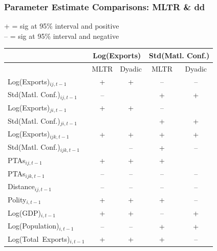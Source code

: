 \documentclass[10pt, compress]{beamer}
\begin{document}
\frame
{
  \frametitle{Parameter Estimate Comparisons: MLTR \& dd}
  \footnotesize{+ = sig at 95\% interval and positive} \\
  \footnotesize{--\; = sig at 95\% interval and negative}
  
  \centering
  \begin{tabular}{l | cc | cc}
~ & \multicolumn{2}{c}{Log(Exports)} & \multicolumn{2}{c}{Std(Matl. Conf.)} \\
\hline\hline
~ & MLTR & Dyadic & MLTR & Dyadic \\
\hline
  Log(Exports)$_{ij, t-1}$ & + & + & -- & -- \\
  Std(Matl. Conf.)$_{ij, t-1}$ & -- &  & + & + \\
  Log(Exports)$_{ji, t-1}$ & + & + & -- &  \\
  Std(Matl. Conf.)$_{ji, t-1}$ &  &  & + & + \\
  Log(Exports)$_{ijk, t-1}$ & + & + & + & + \\
  Std(Matl. Conf.)$_{ijk, t-1}$ &  & -- & + & -- \\
  PTAs$_{ij, t-1}$ & + & + & + &  \\
  PTAs$_{ijk, t-1}$ & -- & -- & -- & -- \\
  Distance$_{ij, t-1}$ & -- & -- & -- & -- \\
  Polity$_{i, t-1}$ & + & + & + & -- \\
  Log(GDP)$_{i, t-1}$ & + & + & -- & + \\
  Log(Population)$_{i, t-1}$ & -- & -- & + & + \\
  Log(Total~Exports)$_{i, t-1}$ & + & + & + & -- 
  \end{tabular}
}
\end{document}
